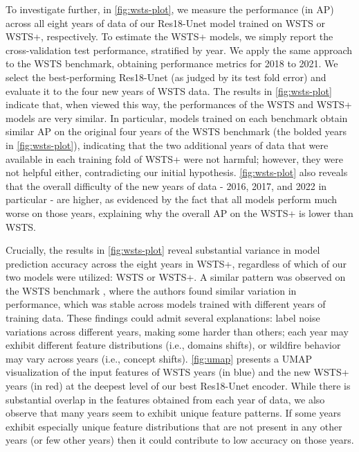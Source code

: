 To investigate further, in \cref{fig:wsts-plot}, we measure the performance (in AP) across all eight years of data of our Res18-Unet model trained on WSTS or WSTS+, respectively.  To estimate the WSTS+ models, we simply report the cross-validation test performance, stratified by year.  We apply the same approach to the WSTS benchmark, obtaining performance metrics for 2018 to 2021.  We select the best-performing Res18-Unet (as judged by its test fold error) and evaluate it to the four new years of WSTS data.  The results in \cref{fig:wsts-plot} indicate that, when viewed this way, the performances of the WSTS and WSTS+ models are very similar.  In particular, models trained on each benchmark obtain similar AP on the original four years of the WSTS benchmark (the bolded years in \cref{fig:wsts-plot}), indicating that the two additional years of data that were available in each training fold of WSTS+ were not harmful; however, they were not helpful either, contradicting our initial hypothesis.  \cref{fig:wsts-plot} also reveals that the overall difficulty of the new years of data - 2016, 2017, and 2022 in particular - are higher, as evidenced by the fact that all models perform much worse on those years, explaining why the overall AP on the WSTS+ is lower than WSTS.  

Crucially, the results in \cref{fig:wsts-plot} reveal substantial variance in model prediction accuracy across the eight years in WSTS+, regardless of which of our two models were utilized: WSTS or WSTS+. A similar pattern was observed on the WSTS benchmark \cite{gerard2023wildfirespreadts}, where the authors found similar variation in performance, which was stable across models trained with different years of training data.  These findings could admit several explanations: label noise variations across different years, making some harder than others; each year may exhibit different feature distributions (i.e., domains shifts), or wildfire behavior may vary across years (i.e., concept shifts).  \cref{fig:umap} presents a UMAP visualization of the input features of WSTS years (in blue) and the new WSTS+ years (in red) at the deepest level of our best Res18-Unet encoder. While there is substantial overlap in the features obtained from each year of data, we also observe that many years seem to exhibit unique feature patterns. If some years exhibit especially unique feature distributions that are not present in any other years (or few other years) then it could contribute to low accuracy on those years.  

